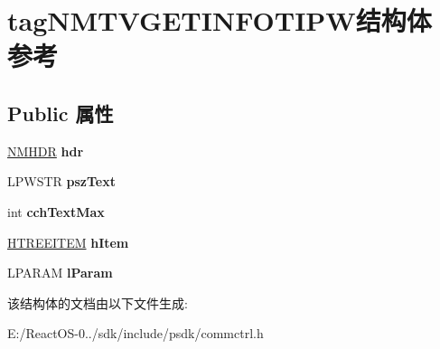\hypertarget{structtag_n_m_t_v_g_e_t_i_n_f_o_t_i_p_w}{}\section{tag\+N\+M\+T\+V\+G\+E\+T\+I\+N\+F\+O\+T\+I\+P\+W结构体 参考}
\label{structtag_n_m_t_v_g_e_t_i_n_f_o_t_i_p_w}
\subsection*{Public 属性}
\begin{DoxyCompactItemize}
\item 
\mbox{\label{structtag_n_m_t_v_g_e_t_i_n_f_o_t_i_p_w_ad01c3c42047da49f13cb4c3575c20c80}} 
\hyperlink{structtag_n_m_h_d_r}{N\+M\+H\+DR} {\bfseries hdr}
\item 
\mbox{\label{structtag_n_m_t_v_g_e_t_i_n_f_o_t_i_p_w_a5df8f8ba02059af02442a1a32d52e767}} 
L\+P\+W\+S\+TR {\bfseries psz\+Text}
\item 
\mbox{\label{structtag_n_m_t_v_g_e_t_i_n_f_o_t_i_p_w_a80f6d0c8025157626a4fe0afe2e00f9b}} 
int {\bfseries cch\+Text\+Max}
\item 
\mbox{\label{structtag_n_m_t_v_g_e_t_i_n_f_o_t_i_p_w_adf71b730f4af5a68d3d393f5ed151f2e}} 
\hyperlink{struct___t_r_e_e_i_t_e_m}{H\+T\+R\+E\+E\+I\+T\+EM} {\bfseries h\+Item}
\item 
\mbox{\label{structtag_n_m_t_v_g_e_t_i_n_f_o_t_i_p_w_a0cd1b8dce4aa4712e4bacb75cd5021ad}} 
L\+P\+A\+R\+AM {\bfseries l\+Param}
\end{DoxyCompactItemize}


该结构体的文档由以下文件生成\+:\begin{DoxyCompactItemize}
\item 
E\+:/\+React\+O\+S-\/0../sdk/include/psdk/commctrl.\+h\end{DoxyCompactItemize}
